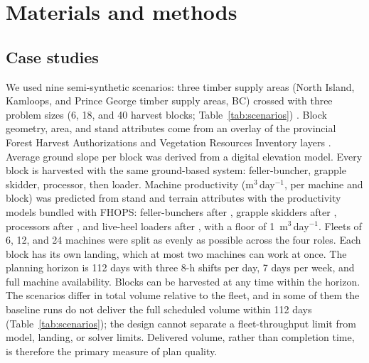 \section{Materials and methods}

\subsection{Case studies}

We used nine semi-synthetic scenarios: three timber supply areas (North Island, Kamloops, and Prince
George timber supply areas, BC) crossed with three problem sizes (6, 18, and 40 harvest blocks;
Table~\ref{tab:scenarios}) \citep{jaffray2026zenodo}. Block geometry, area, and stand attributes
come from an overlay of the provincial Forest Harvest Authorizations and Vegetation Resources
Inventory layers \citep{bcgov_fha,bcgov_vri}. Average ground slope per block was derived from a
digital elevation model. Every block is harvested with the same ground-based system: feller-buncher,
grapple skidder, processor, then loader. Machine productivity (m$^3$\,day$^{-1}$, per machine and
block) was predicted from stand and terrain attributes with the productivity models bundled with
FHOPS: feller-bunchers after \citet{lahrsen2025thesis}, grapple skidders after \citet{kosicki2005adv6n7},
processors after \citet{berry2019processor}, and live-heel loaders after \citet{harvey1982tn46},
with a floor of
1~m$^3$\,day$^{-1}$. Fleets of 6, 12, and 24 machines were split as evenly as possible across the
four roles. Each block has its own landing, which at most two machines can work at once. The
planning horizon is 112 days with three 8-h shifts per day, 7 days per week, and full machine
availability. Blocks can be harvested at any time within the horizon. The scenarios differ in
total volume relative to the fleet, and in some of them the baseline runs do not deliver the full
scheduled volume within 112 days (Table~\ref{tab:scenarios}); the design cannot separate a
fleet-throughput limit from model, landing, or solver limits. Delivered volume, rather than
completion time, is therefore the primary measure of plan quality.

\begin{table}[htbp]
  \centering
  \caption{Scenario characteristics. Machines are given as total
  (feller-buncher/grapple skidder/processor/loader). Volume is the total volume to be harvested;
  slope and stem size are block means. All scenarios have one landing per block (capacity two
  machines), a 112-day horizon, and three 8-h shifts per day.}
  \label{tab:scenarios}
  \small
  \setlength{\tabcolsep}{4pt}
  
\end{table}

